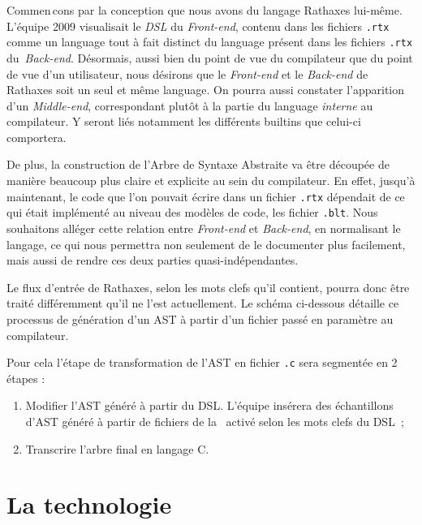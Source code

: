 \documentclass{rtxreport}
\begin{document}
\hbox{}
Commen\,{c}ons par la conception que nous avons du langage Rathaxes
lui-m\^{e}me. L'\'{e}quipe 2009 visualisait le \emph{DSL} du \emph{Front-end},
contenu dans les fichiers \texttt{.rtx} comme un language tout \`{a} fait
distinct du language pr\'{e}sent dans les fichiers \texttt{.rtx} du\
\emph{Back-end}. D\'{e}sormais, aussi bien du point de vue du compilateur que
du point de vue d'un utilisateur, nous d\'{e}sirons que le \emph{Front-end} et
le \emph{Back-end} de Rathaxes soit un seul et m\^{e}me language. On pourra
aussi constater l'apparition d'un \emph{Middle-end}, correspondant plut\^{o}t
\`{a} la partie du language \emph{interne} au compilateur. Y seront li\'{e}s
notamment les diff\'{e}rents builtins que celui-ci comportera.

\hbox{}
De plus, la construction de l'Arbre de Syntaxe Abstraite va \^{e}tre
d\'{e}coup\'{e}e de mani\`{e}re beaucoup plus claire et explicite au sein du
compilateur.
En effet, jusqu'\`{a} maintenant, le code que l'on pouvait \'{e}crire dans un
fichier \texttt{.rtx} d\'{e}pendait de ce qui \'{e}tait impl\'{e}ment\'{e} au
niveau des mod\`{e}les de code, les fichier \texttt{.blt}. Nous souhaitons
all\'{e}ger cette relation entre \emph{Front-end} et \emph{Back-end}, en
normalisant le langage, ce qui nous permettra non seulement de le documenter
plus facilement, mais aussi de rendre ces deux parties quasi-ind\'{e}pendantes.

Le flux d'entr\'{e}e de Rathaxes, selon les mots clefs qu'il contient,
pourra donc \^{e}tre trait\'{e} diff\'{e}remment qu'il ne l'est actuellement.  
Le sch\'{e}ma ci-dessous d\'{e}taille ce processus de g\'{e}n\'{e}ration d'un
AST \`{a} partir d'un fichier pass\'{e} en param\`{e}tre au compilateur.

\hbox{}

\hbox{}
Pour cela l'étape de transformation de l'AST en fichier \texttt{.c} sera
segmentée en 2 étapes :
\begin{enumerate}
\item Modifier l'AST généré à partir du DSL. L'équipe insérera des échantillons
d'AST généré à partir de fichiers de la \BL\ activé selon les mots clefs du
DSL~;
\item Transcrire l'arbre final en langage C.
\end{enumerate}

\chapter{La technologie \rtx}
\end{document}
